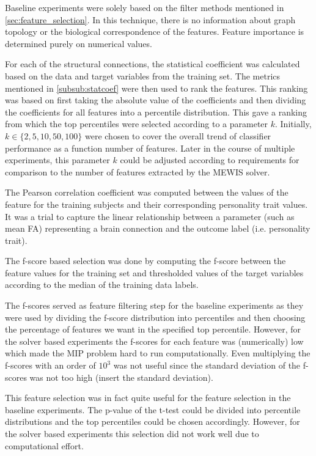 \documentclass[msthesis.tex]{subfiles}
\begin{document}
Baseline experiments were solely based on the filter methods mentioned in \autoref{sec:feature_selection}. In this technique, there is no information about graph topology or the biological correspondence of the features. Feature importance is determined purely on numerical values.

For each of the structural connections, the statistical coefficient was calculated based on the data and target variables from the training set. The metrics mentioned in \autoref{subsub:statcoef} were then used to rank the features. This ranking was based on first taking the absolute value of the coefficients and then dividing the coefficients for all features into a percentile distribution. This gave a ranking from which the top percentiles were selected according to a parameter $k$. Initially, $k \in \{2,5,10,50,100\}$ were chosen to cover the  overall trend of classifier performance as a function number of features. Later in the course of multiple experiments, this parameter $k$ could be adjusted according to requirements for comparison to the number of features extracted by the \gls{MEWIS} solver.

\iffalse
The Pearson correlation coefficient was computed between the values of the feature for the training subjects and their corresponding personality trait values. It was a trial to capture the linear relationship between a parameter (such as mean \gls{FA}) representing a brain connection and the outcome label (i.e. personality trait).

The f-score based selection was done by computing the f-score between the feature values for the training set and thresholded values of the target variables according to the median of the training data labels. 

The f-scores served as feature filtering step for the baseline experiments as they were used by dividing the f-score distribution into percentiles and then choosing the percentage of features we want in the specified top percentile. However, for the solver based experiments the f-scores for each feature was (numerically) low which made the MIP problem hard to run computationally. Even multiplying the f-scores with an order of $10^3$ was not useful since the standard deviation of the f-scores was not too high (insert the standard deviation). 

This feature selection was in fact quite useful for the feature selection in the baseline experiments. The p-value of the t-test could be divided into percentile distributions and the top percentiles could be chosen accordingly. However, for the solver based experiments this selection did not work well due to computational effort. 
\end{document}
